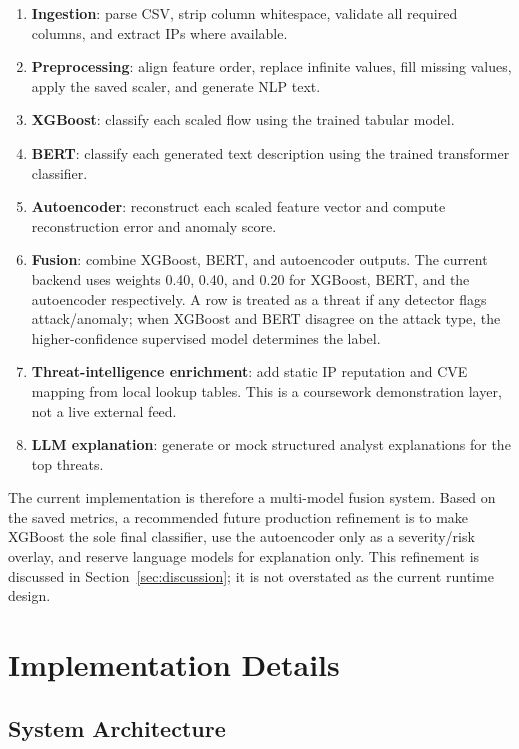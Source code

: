 \documentclass[12pt,a4paper]{article}
\begin{document}
\begin{enumerate}[leftmargin=1.2cm]
    \item \textbf{Ingestion}: parse CSV, strip column whitespace, validate all required columns, and extract IPs where available.
    \item \textbf{Preprocessing}: align feature order, replace infinite values, fill missing values, apply the saved scaler, and generate NLP text.
    \item \textbf{XGBoost}: classify each scaled flow using the trained tabular model.
    \item \textbf{BERT}: classify each generated text description using the trained transformer classifier.
    \item \textbf{Autoencoder}: reconstruct each scaled feature vector and compute reconstruction error and anomaly score.
    \item \textbf{Fusion}: combine XGBoost, BERT, and autoencoder outputs. The current backend uses weights 0.40, 0.40, and 0.20 for XGBoost, BERT, and the autoencoder respectively. A row is treated as a threat if any detector flags attack/anomaly; when XGBoost and BERT disagree on the attack type, the higher-confidence supervised model determines the label.
    \item \textbf{Threat-intelligence enrichment}: add static IP reputation and CVE mapping from local lookup tables. This is a coursework demonstration layer, not a live external feed.
    \item \textbf{LLM explanation}: generate or mock structured analyst explanations for the top threats.
\end{enumerate}

The current implementation is therefore a multi-model fusion system. Based on the saved metrics, a recommended future production refinement is to make XGBoost the sole final classifier, use the autoencoder only as a severity/risk overlay, and reserve language models for explanation only. This refinement is discussed in Section~\ref{sec:discussion}; it is not overstated as the current runtime design.

\section{Implementation Details}

\subsection{System Architecture}
\end{document}
